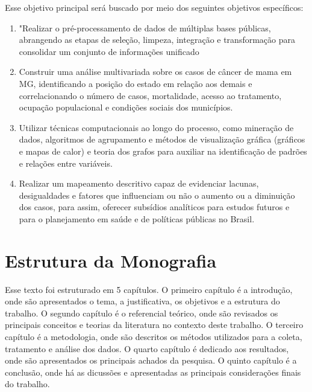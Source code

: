 Esse objetivo principal será buscado por meio dos seguintes objetivos específicos:

\begin{enumerate}
\item "Realizar o pré-processamento de dados de múltiplas bases públicas, abrangendo as etapas de seleção, limpeza, integração e transformação para consolidar um conjunto de informações unificado
\item Construir uma análise multivariada sobre os casos de câncer de mama em MG, identificando a posição do estado  em relação aos demais e correlacionando o número de casos, mortalidade, acesso ao tratamento, ocupação populacional e condições sociais dos municípios.
\item Utilizar técnicas computacionais ao longo do processo, como mineração de dados, algoritmos de agrupamento e métodos de visualização gráfica (gráficos e mapas de calor) e teoria dos grafos para auxiliar na identificação de padrões e relações entre variáveis.
\item Realizar um mapeamento descritivo capaz de evidenciar lacunas, desigualdades e fatores que influenciam ou não o aumento ou a diminuição dos casos, para assim, oferecer subsídios analíticos para estudos futuros e para o planejamento em saúde e de políticas públicas no Brasil.
\end{enumerate}

\chapter{Estrutura da Monografia}

Esse texto foi estruturado em 5 capítulos. O primeiro capítulo é a introdução, onde são apresentados o tema, a justificativa, os objetivos e a estrutura do trabalho. O segundo capítulo é o referencial teórico, onde são revisados os principais conceitos e teorias da literatura no contexto deste trabalho. O terceiro capítulo é a metodologia, onde são descritos os métodos utilizados para a coleta, tratamento e análise dos dados. O quarto capítulo é dedicado aos resultados, onde são apresentados os principais achados da pesquisa. O quinto capítulo é a conclusão, onde há as dicussões e apresentadas as principais considerações finais do trabalho.


